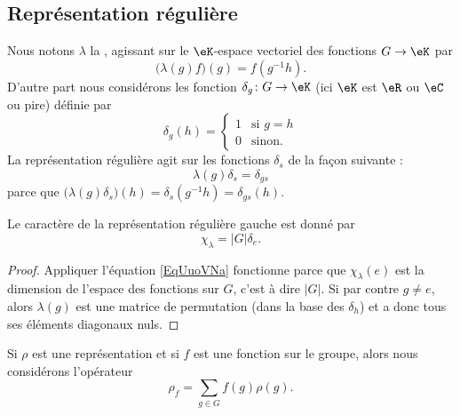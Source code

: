 \subsection{Représentation régulière}

Nous notons \( \lambda\) la , agissant sur le \( \eK\)-espace vectoriel des fonctions \( G\to \eK\) par
\begin{equation}
    \Big( \lambda(g)f \Big)(g)=f(g^{-1}h).
\end{equation}
D'autre part nous considérons les fonction \( \delta_g\colon G\to \eK\) (ici \( \eK\) est \( \eR\) ou \( \eC\) ou pire) définie par
\begin{equation}
    \delta_g(h)=\begin{cases}
        1    &   \text{si } g=h\\
        0    &    \text{sinon.}
    \end{cases}
\end{equation}
La représentation régulière agit sur les fonctions \( \delta_s\) de la façon suivante :
\begin{equation}
    \lambda(g)\delta_s=\delta_{gs}
\end{equation}
parce que \( \big( \lambda(g)\delta_s \big)(h)=\delta_s(g^{-1}h)=\delta_{gs}(h)\).

\begin{lemma}
    Le caractère de la représentation régulière gauche est donné par 
    \begin{equation}        \label{EqUuoVNa}
        \chi_{\lambda}=| G |\delta_e.
    \end{equation}
\end{lemma}

\begin{proof}
    Appliquer l'équation \eqref{EqUuoVNa} fonctionne parce que \( \chi_{\lambda}(e)\) est la dimension de l'espace des fonctions sur \( G\), c'est à dire \( | G |\). Si par contre \( g\neq e\), alors \( \lambda(g)\) est une matrice de permutation (dans la base des \( \delta_h\)) et a donc tous ses éléments diagonaux nuls.
\end{proof}

Si \( \rho\) est une représentation et si \( f\) est une fonction sur le groupe, alors nous considérons l'opérateur
\begin{equation}
    \rho_f=\sum_{g\in G}f(g)\rho(g).
\end{equation}

